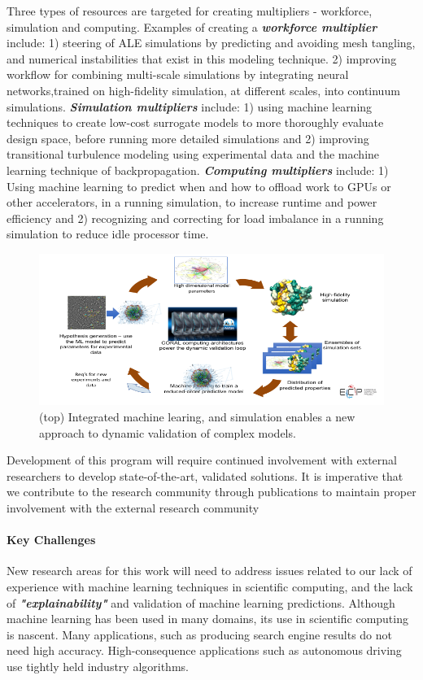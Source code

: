 Three types of resources are targeted for creating multipliers - workforce, simulation and computing. 
Examples of creating a \textbf{\textit{workforce multiplier}} include: 1) steering of ALE simulations by predicting and 
avoiding mesh tangling, and numerical instabilities  that exist in this modeling technique. \cite{cognitive-jiang} 
2) improving workflow for combining multi-scale simulations by integrating neural networks,trained on 
high-fidelity simulation, at different scales, into continuum simulations. \cite{cognitive-Jacobs}
\textbf{\textit{Simulation multipliers}} include: 1) using machine learning techniques to create low-cost surrogate 
models to more thoroughly evaluate design space, before running more detailed simulations and 
2) improving transitional turbulence modeling using experimental data and the machine learning technique 
of backpropagation.   
\textbf{\textit{Computing multipliers}} include: 1) Using machine learning to predict when and how to offload work 
to GPUs or other accelerators, in a running simulation, to increase runtime and power efficiency and 2) recognizing 
and correcting for load imbalance in a running simulation to reduce idle processor time.
\begin{figure}[htb]
	\centering
	\includegraphics[width=6in]{IntegratedML}
	\caption{\label{fig:CognitiveComputing-overview} (top) Integrated machine learing, and simulation 
enables a new approach to dynamic validation of complex models. } \end{figure}

Development of this program will require continued involvement with external researchers to develop state-of-the-art, 
validated solutions.  It is imperative that we contribute to the research community through publications to maintain 
proper involvement with the external research community

\paragraph{Key Challenges}
New research areas for this work will need to address issues related to our lack of experience with machine learning 
techniques in scientific computing, and the lack of \textbf{\textit{"explainability"}} and validation of machine learning predictions. 
Although machine learning has been used in many domains, its use in scientific computing is nascent.  Many applications, 
such as producing search engine results do not need high accuracy.  High-consequence applications such as autonomous 
driving use tightly held industry algorithms.   

